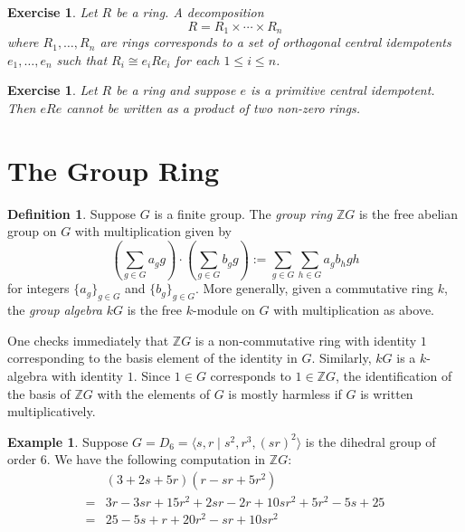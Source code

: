 \documentclass[12pt]{article}
\theoremstyle{plain}
\newtheorem{exercise}[theorem]{Exercise}
\theoremstyle{definition}
\newtheorem{definition}[theorem]{Definition}
\newtheorem{example}[theorem]{Example}
\theoremstyle{remark}
\numberwithin{equation}{section}
\begin{document}
\begin{exercise}
Let $R$ be a ring.  A decomposition
\[
R= R_1 \times \cdots \times R_n
\]
where $R_1,\ldots,R_n$ are rings corresponds to a set of orthogonal
central idempotents $e_1,\ldots,e_n$ such
that $R_i \cong e_iRe_i$ for each $1 \le i \le n$.
\end{exercise}

\begin{exercise}
Let $R$ be a ring and suppose $e$ is a primitive central idempotent.
Then $eRe$ cannot be written as a product of two non-zero rings.
\end{exercise}



\section{The Group Ring}

\begin{definition}
Suppose $G$ is a finite group.
The \emph{group ring} $\mathbb{Z}G$ is the free abelian group
on $G$ with multiplication given by
\[
\left( \sum_{g \in G} a_g g \right) \cdot
\left( \sum_{g \in G} b_g g \right)
:= \sum_{g \in G} \sum_{h \in G} a_gb_h gh
\]
for integers $\{a_g\}_{g\in G}$ and $\{b_g\}_{g\in G}$.
More generally, given a commutative ring $k$,
the \emph{group algebra} $kG$ is the free $k$-module on $G$
with multiplication as above.
\end{definition}

One checks immediately that $\mathbb{Z}G$ is a non-commutative ring with
identity $1$ corresponding to the basis element of the identity in $G$.
Similarly, $kG$ is a $k$-algebra with identity $1$.
Since $1 \in G$ corresponds to $1 \in \mathbb{Z}G$,
the identification of the basis of $\mathbb{Z}G$ with the elements of
$G$ is mostly harmless if $G$ is written multiplicatively.

\begin{example}
Suppose $G=D_6=\langle s,r \mid s^2, r^3, (sr)^2 \rangle$
is the dihedral group of order $6$.
We have the following computation in $\mathbb{Z}G$:
\begin{align*}
&(3 + 2s + 5r)(r-sr + 5r^2)\\
=& 3r -3sr +15r^2 + 2sr -2r+10sr^2 +5r^2 -5s+25\\
=& 25 -5s + r + 20r^2 -sr +10sr^2
\end{align*}
\end{example}
\end{document}

